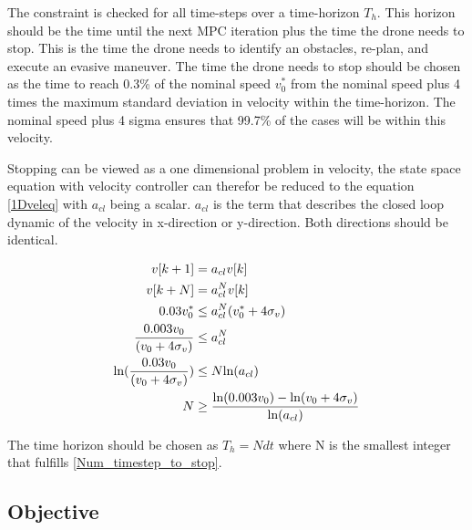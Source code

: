 The constraint is checked for all time-steps over a time-horizon $T_h$. This horizon should be the time until the next MPC iteration plus the time the drone needs to stop. This is the time the drone needs to identify an obstacles, re-plan, and execute an evasive maneuver. The time the drone needs to stop should be chosen as the time to reach 0.3\% of the nominal speed $v_0^*$ from the nominal speed plus 4 times the maximum standard deviation in velocity within the time-horizon. The nominal speed plus 4 sigma ensures that 99.7\% of the cases will be within this velocity. 

Stopping can be viewed as a one dimensional problem in velocity, the state space equation with velocity controller can therefor be reduced to the equation \eqref{1Dveleq} with $a_{cl}$ being a scalar. $a_{cl}$ is the term that describes the closed loop dynamic of the velocity in x-direction or y-direction. Both directions should be identical. 

\begin{align} 
    v[k+1] & = a_{cl} v[k]  \label{1Dveleq}\\
    v[k+N] & = a_{cl}^N v[k]\\
    0.03 v_0^* & \leq a_{cl}^N (v_0^* + 4 \sigma_v) \\
    \frac{0.003 v_0}{(v_0 + 4 \sigma_v)} & \leq a_{cl}^N  \\
    \textnormal{ln}(\frac{0.03 v_0}{(v_0 + 4 \sigma_v)}) & \leq N \textnormal{ln}(a_{cl}) \\
    N  & \geq \frac{\textnormal{ln}(0.003 v_0) - \textnormal{ln}(v_0 + 4 \sigma_v)}{\textnormal{ln}(a_{cl})} \label{Num_timestep_to_stop}
\end{align}

The time horizon should be chosen as $T_h = N dt$ where N is the smallest integer that fulfills \eqref{Num_timestep_to_stop}.


\subsection{Objective}


